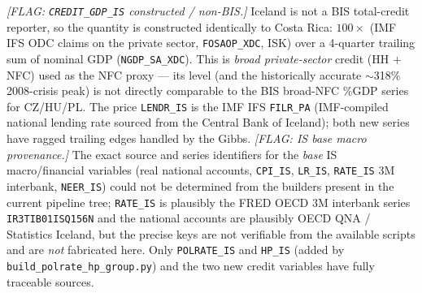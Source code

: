 \noindent\textit{[FLAG: \texttt{CREDIT\_GDP\_IS} constructed / non-BIS.]}
Iceland is not a BIS total-credit reporter, so the quantity is constructed
identically to Costa Rica: $100\times$ (IMF IFS ODC claims on the private
sector, \texttt{FOSAOP\_XDC}, ISK) over a 4-quarter trailing sum of
nominal GDP (\texttt{NGDP\_SA\_XDC}).  This is \emph{broad private-sector}
credit (HH $+$ NFC) used as the NFC proxy --- its level (and the
historically accurate $\sim$318\% 2008-crisis peak) is not directly
comparable to the BIS broad-NFC \%GDP series for CZ/HU/PL.  The price
\texttt{LENDR\_IS} is the IMF IFS \texttt{FILR\_PA} (IMF-compiled national
lending rate sourced from the Central Bank of Iceland); both new series
have ragged trailing edges handled by the Gibbs.
\textit{[FLAG: IS base macro provenance.]} The exact source and series
identifiers for the \emph{base} IS macro/financial variables (real
national accounts, \texttt{CPI\_IS}, \texttt{LR\_IS}, \texttt{RATE\_IS}
3M interbank, \texttt{NEER\_IS}) could not be determined from the builders
present in the current pipeline tree; \texttt{RATE\_IS} is plausibly the
FRED OECD 3M interbank series \texttt{IR3TIB01ISQ156N} and the national
accounts are plausibly OECD QNA / Statistics Iceland, but the precise keys
are not verifiable from the available scripts and are \emph{not}
fabricated here.  Only \texttt{POLRATE\_IS} and \texttt{HP\_IS} (added by
\texttt{build\_polrate\_hp\_group.py}) and the two new credit variables
have fully traceable sources.



